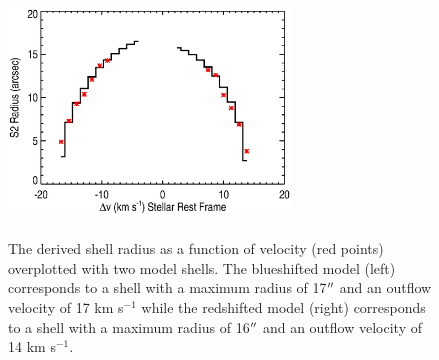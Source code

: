 \documentclass[iop]{emulateapj}
\begin{document}
\begin{figure}
\includegraphics[trim=45pt 0pt 80pt 10pt, width=7.5cm, height=6.5cm]{f13.eps}
\caption{The derived shell radius as a function of velocity (red points) overplotted with two model shells. The blueshifted model (left) corresponds to a shell with a maximum radius of 17$\mbox{$^{\prime\prime}$}$ and an outflow velocity of 17 km s${}^{-1}$ while the redshifted model (right) corresponds to a shell with a maximum radius of 16$\mbox{$^{\prime\prime}$}$ and an outflow velocity of 14 km s${}^{-1}$.}
\label{fig:fig5}
\end{figure}
\end{document}
